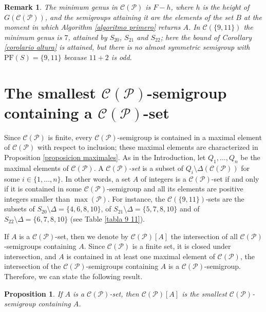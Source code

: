 \documentclass[11pt]{article}
\newtheorem{proposition}[theorem]{Proposition}
\newtheorem{remark}[theorem]{Remark}
\numberwithin{equation}{section}
\newcommand{\CP}{\mathcal C(\mathcal P)}
\newcommand{\PF}{\mathrm{PF}}
\begin{document}
\begin{remark}
The minimum genus in $\CP$ is $F-h$, where $h$ is the height of $G(\CP)$, and the semigroups attaining it are the elements of the set $B$ at the moment in which Algorithm \ref{algoritmo primero} returns $A$. In $\mathcal C(\{9,11\})$ the minimum genus is $7$, attained by $S_{20}$, $S_{21}$ and $S_{22}$; here the bound of Corollary \ref{corolario altura} is attained, but there is no almost symmetric semigroup with $\PF(S)=\{9,11\}$ because $11+2$ is odd.
\end{remark}

\section{The smallest \texorpdfstring{$\mathcal C(\mathcal P)$}{C(P)}-semigroup containing a \texorpdfstring{$\mathcal C(\mathcal P)$}{C(P)}-set}\label{sec:smallest}

Since $\CP$ is finite, every $\CP$-semigroup is contained in a maximal element of $\CP$ with respect to inclusion; these maximal elements are characterized in Proposition \ref{proposicion maximales}. As in the Introduction, let $Q_1,\ldots,Q_n$ be the maximal elements of $\CP$. A \textit{$\CP$-set} is a subset of $Q_i\setminus\Delta(\CP)$ for some $i\in\{1,\ldots,n\}$. In other words, a set $A$ of integers is a $\CP$-set if and only if it is contained in some $\CP$-semigroup and all its elements are positive integers smaller than $\max(\mathcal P)$. For instance, the $\mathcal C(\{9,11\})$-sets are the subsets of $S_{20}\setminus\Delta=\{4,6,8,10\}$, of $S_{21}\setminus\Delta=\{5,7,8,10\}$ and of $S_{22}\setminus\Delta=\{6,7,8,10\}$ (see Table \ref{tabla 9 11}).

If $A$ is a $\mathcal C(\mathcal P)$-set, then we denote by $\mathcal C(\mathcal P)[A]$ the intersection of all $\mathcal{ C(\mathcal P)}$-semigroups containing $A$. Since $\mathcal C(\mathcal P)$ is a finite set, it is closed under intersection, and $A$ is contained in at least one maximal element of $\CP$, the intersection of the $\mathcal C(\mathcal P)$-semigroups containing $A$ is a $\mathcal C(\mathcal P)$-semigroup. Therefore, we can state the following result.

\begin{proposition}
    If $A$ is a $\mathcal C(\mathcal P)$-set, then $\mathcal C(\mathcal P)[A]$ is the smallest $\mathcal C(\mathcal P)$-semigroup containing $A$.
\end{proposition}
\end{document}
